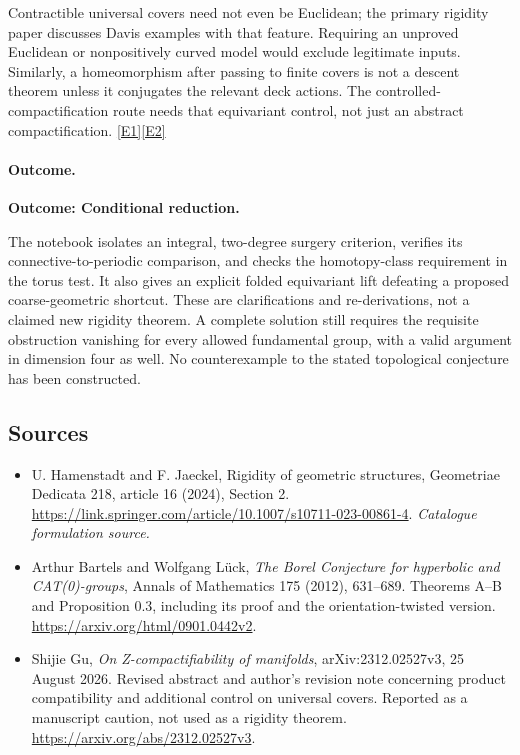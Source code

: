 \documentclass[11pt,a4paper]{article}
\newcommand{\eref}[2]{\hyperlink{extra:#1:#2}{[E#2]}}
\numberwithin{equation}{section}
\begin{document}
Contractible universal covers need not even be Euclidean; the primary
rigidity paper discusses Davis examples with that feature. Requiring an
unproved Euclidean or nonpositively curved model would exclude legitimate
inputs. Similarly, a homeomorphism after passing to finite covers is not
a descent theorem unless it conjugates the relevant deck actions.
The controlled-compactification route needs that equivariant control,
not just an abstract compactification. \eref{30006734}{1}\eref{30006734}{2}

\paragraph{Outcome.}
\textbf{Outcome: Conditional reduction.}

The notebook isolates an integral, two-degree surgery criterion, verifies
its connective-to-periodic comparison, and checks the homotopy-class
requirement in the torus test. It also gives an explicit folded equivariant
lift defeating a proposed coarse-geometric shortcut. These are
clarifications and re-derivations, not a claimed new rigidity theorem.
A complete solution still requires the requisite obstruction vanishing
for every allowed fundamental group, with a valid argument in dimension
four as well. No counterexample to the stated topological conjecture has
been constructed.

\subsection{Sources}
\begin{itemize}\raggedright
\item[\textnormal{[S1]}]\hypertarget{source:30006734:1}{} U. Hamenstadt and F. Jaeckel, Rigidity of geometric structures, Geometriae Dedicata 218, article 16 (2024), Section 2.
\url{https://link.springer.com/article/10.1007/s10711-023-00861-4}.
{\small\textit{Catalogue formulation source.}}
\item[\textnormal{[E1]}]\hypertarget{extra:30006734:1}{} Arthur Bartels and Wolfgang L\"uck,
\emph{The Borel Conjecture for hyperbolic and CAT(0)-groups},
Annals of Mathematics 175 (2012), 631--689. Theorems A--B and
Proposition 0.3, including its proof and the orientation-twisted version.
\url{https://arxiv.org/html/0901.0442v2}.
\item[\textnormal{[E2]}]\hypertarget{extra:30006734:2}{} Shijie Gu,
\emph{On Z-compactifiability of manifolds}, arXiv:2312.02527v3,
25 August 2026. Revised abstract and author's revision note concerning
product compatibility and additional control on universal covers.
Reported as a manuscript caution, not used as a rigidity theorem.
\url{https://arxiv.org/abs/2312.02527v3}.
\end{itemize}
\end{document}
